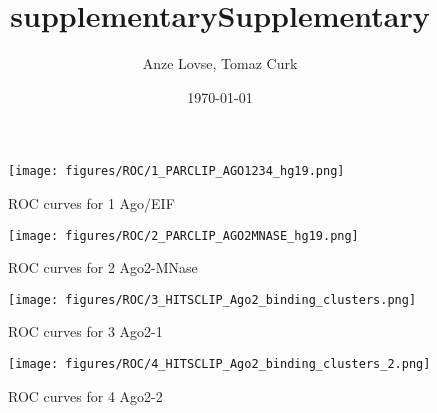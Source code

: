 \documentclass[11pt]{article}
\title{supplementary}
\begin{document}
    
    \author{Anze Lovse, Tomaz Curk}\title{Supplementary}

\date{\today}
\maketitle

    
    

    




    
    \begin{figure}
        \begin{center}
            \texttt{[image: figures/ROC/1\_PARCLIP\_AGO1234\_hg19.png]}
            \caption{ROC curves for 1 Ago/EIF}
            \label{fig:ROC1 Ago/EIF}
        \end{center}
    \end{figure}

    
    
    \begin{figure}
        \begin{center}
            \texttt{[image: figures/ROC/2\_PARCLIP\_AGO2MNASE\_hg19.png]}
            \caption{ROC curves for 2 Ago2-MNase}
            \label{fig:ROC2 Ago2-MNase}
        \end{center}
    \end{figure}

    
    
    \begin{figure}
        \begin{center}
            \texttt{[image: figures/ROC/3\_HITSCLIP\_Ago2\_binding\_clusters.png]}
            \caption{ROC curves for 3 Ago2-1}
            \label{fig:ROC3 Ago2-1}
        \end{center}
    \end{figure}

    
    
    \begin{figure}
        \begin{center}
            \texttt{[image: figures/ROC/4\_HITSCLIP\_Ago2\_binding\_clusters\_2.png]}
            \caption{ROC curves for 4 Ago2-2}
            \label{fig:ROC4 Ago2-2}
        \end{center}
    \end{figure}

    
    
\end{document}
